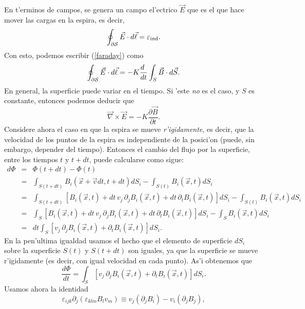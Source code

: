 En t'erminos de campos, se genera un campo el'ectrico $\vec{E}$ que es el que hace mover las cargas en la espira, es decir,
\begin{equation}
\oint_{\cal\partial S}\vec{E}\cdot d\vec{\ell}=\varepsilon_{\rm ind}.
\end{equation}
Con esto, podemos escribir (\ref{faraday}) como
\begin{equation}
\oint_{\cal \partial S}\vec{E}\cdot d\vec{\ell}=-K\frac{d\ }{dt}\int_S\vec{B}\cdot
d\vec{S}.
\end{equation}
En general, la superficie puede variar en el tiempo. Si 'este \textit{no} es el caso, y $S$
es constante, entonces podemos deducir que
\begin{equation}\label{ley-faraday0}
\vec\nabla\times\vec{E}=-K\frac{\partial\vec{B}}{\partial t}.
\end{equation}
Considere ahora el caso en que la espira se mueve \textit{r'igidamente}, es decir, que la velocidad de los puntos de la espira es independiente de la posici'on (puede, sin embargo, depender del tiempo).
Entonces el cambio del flujo por la superficie, entre los tiempos $t$ y $t+dt$, puede calcularse como sigue:
\begin{eqnarray}
 d\Phi &=& \Phi(t+dt)-\Phi(t)\\
&=&
\int_{S(t+dt)}B_i(\vec{x}+\vec{v}dt,t+dt)dS_i-\int_{S(t)}B_i(\vec{x},t)dS_i\\
&=&\int_{S(t+dt)}\left[B_i(\vec{x},t)+dt\,v_j\,\partial_jB_i(\vec{x},
t)+dt\,\partial_tB_i(\vec{x},t)\right ] dS_i-\int_{S(t)}B_i(\vec{x},t)dS_i\\
&=&\int_S\left[B_i(\vec{x},t)+dt\,v_j\,\partial_jB_i(\vec{x},
t)+dt\,\partial_tB_i(\vec{x},t)\right ] dS_i-\int_SB_i(\vec{x},t)dS_i\\
&=&dt\int_S\left[v_j\,\partial_jB_i(\vec{x},t)+\partial_tB_i(\vec{x},t)\right
] dS_i.
\end{eqnarray}
En la pen'ultima igualdad usamos el hecho que el elemento de superficie $dS_i$ sobre la superficie $S(t)$ y $S(t+dt)$ son iguales, ya que la superficie se mueve r'igidamente (es decir, con igual velocidad en cada punto). As'i obtenemos que
\begin{equation}\label{dPhidt0}
 \frac{d\Phi}{dt}=\int_S\left[v_j\,\partial_jB_i(\vec{x},t)+\partial_tB_i(\vec
{x},t)\right] dS_i.
\end{equation}
Usamos ahora la identidad
\begin{equation}
\varepsilon_{ijk}\partial_j(\varepsilon_{klm}B_lv_m)\equiv
v_j(\partial_jB_i)-v_i(\partial_jB_j),
\end{equation}
